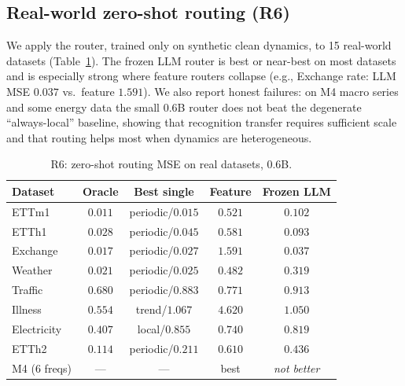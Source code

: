 \documentclass{article}
\begin{document}
\subsection{Real-world zero-shot routing (R6)}
We apply the router, trained only on synthetic clean dynamics, to 15 real-world
datasets (Table~\ref{tab:real}).  The frozen LLM router is best or near-best on
most datasets and is especially strong where feature routers collapse (e.g.,
Exchange rate: LLM MSE $0.037$ vs.\ feature $1.591$).  We also report honest
failures: on M4 macro series and some energy data the small $0.6$B router does
not beat the degenerate ``always-local'' baseline, showing that recognition
transfer requires sufficient scale and that routing helps most when dynamics
are heterogeneous.

\begin{table}[t]
\centering
\small
\begin{tabular}{lcccc}
\toprule
Dataset & Oracle & Best single & Feature & Frozen LLM \\
\midrule
ETTm1 & $0.011$ & periodic/$0.015$ & $0.521$ & $\mathbf{0.102}$ \\
ETTh1 & $0.028$ & periodic/$0.045$ & $0.581$ & $\mathbf{0.093}$ \\
Exchange & $0.017$ & periodic/$0.027$ & $1.591$ & $\mathbf{0.037}$ \\
Weather & $0.021$ & periodic/$0.025$ & $0.482$ & $\mathbf{0.319}$ \\
Traffic & $0.680$ & periodic/$0.883$ & $0.771$ & $0.913$ \\
Illness & $0.554$ & trend/$1.067$ & $4.620$ & $\mathbf{1.050}$ \\
\midrule
Electricity & $0.407$ & local/$0.855$ & $\mathbf{0.740}$ & $0.819$ \\
ETTh2 & $0.114$ & periodic/$0.211$ & $\mathbf{0.610}$ & $0.436$ \\
M4 (6 freqs) & --- & --- & best & \emph{not better} \\
\bottomrule
\end{tabular}
\caption{R6: zero-shot routing MSE on real datasets, 0.6B.}
\label{tab:real}
\end{table}
\end{document}
